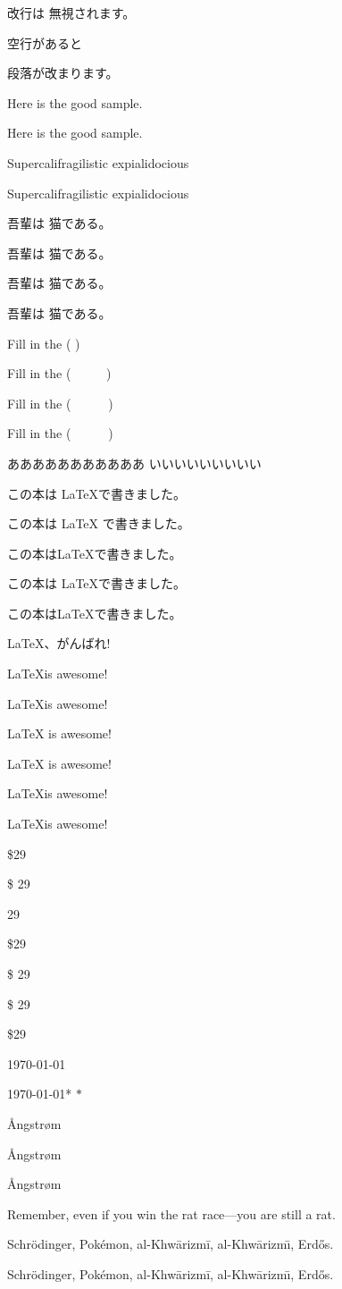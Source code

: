 \documentclass{jlreq}
\begin{document}
改行は
無視されます。

空行があると

段落が改まります。

Here is the 
good sample.

Here is the
good sample.

Supercalifragilistic
expialidocious

Supercalifragilistic%
expialidocious

吾輩は
猫である。

吾輩は 
猫である。

吾輩は%
猫である。


吾輩は %
猫である。

Fill in the (       )

Fill in the ( \ \ \ \ \ )

Fill in the (~~~~~~)
  
Fill in the (\ \ \ \ \ \ )

                   あああああああああああ               
                いいいいいいいいい             

この本は \LaTeX で書きました。

この本は \LaTeX
で書きました。

この本は\LaTeX{}で書きました。

この本は \LaTeX{}で書きました。

この本は{\LaTeX}で書きました。

\LaTeX、がんばれ!%

\LaTeX is awesome!

\LaTeX                 is awesome!

\LaTeX{} is awesome!

{\LaTeX} is awesome!

\LaTeX{}is awesome!

{\LaTeX}is awesome!

\$29

\$ 29

{29}

\${29}

\${ 29}

\${ 29
}

\${29
}

\today


{\today}* $*$ \textasteriskcentered

\AA ngstr\o m

\AA{}ngstr\o{}m

{\AA}ngstr{\o}m

Remember, even if you win the rat race---you are still a rat.

Schr\"{o}dinger, Pok\'{e}mon, al-Khw\={a}rizm\={i}, al-Khw\={a}rizm\={\i}, Erd\H{o}s.

Schr\"odinger, Pok\'emon, al-Khw\=arizm\=i, al-Khw\=arizm\=\i, Erd\H{o}s. %
\end{document}
